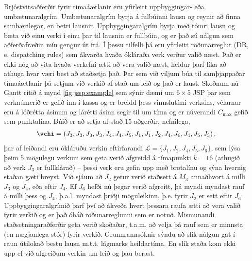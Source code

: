 \documentclass[]{article}
\begin{document}
Brjóstvitsaðferðir fyrir tímaáætlanir eru yfirleitt uppbyggingar- eða 
umbætunaralgrím.
Umbætunaralgrím byrja á fulbúinni lausn og reynir að finna sambærilegar, en 
betri lausnir. 
Uppbyggingaralgrím byrja með tómri lausn og bæta við einu verki í einu þar til 
lausnin er fullbúin, og er það sú nálgun sem aðferðafræðin mín gengur út frá. 
Í þessu tilfelli þá eru yfirleitt röðunarreglur (DR, e. dispatching 
rules) sem ákvarða hvaða ókláraða verk verður valið næst. Það er ekki nóg að 
vita hvaða verkefni ætti að vera valið næst, 
heldur þarf líka að athuga hvar væri best að staðsetja það. 
Þar sem við viljum búa til samþjappaðar tímaáætlanir  þá setjum við verkið af 
stað um leið og það er laust. 
Skoðnum nú Gantt ritið á mynd \ref{fig:jssp:example} sem sýnir dæmi um 
$6\times5$ JSP þar sem verknúmerið er gefið inn í kassa og er breidd þess 
vinnslutími verksins, 
vélarnar eru á lóðrétta ásinum og lárétti ásinn segir til um tíma 
og er núverandi $C_{\max}$ gefið sem punktalína. 
Búið er að setja af stað 15 aðgerðir, nefnilega, 
\begin{eqnarray}
\vchi=\left(J_3,J_3,J_3,J_3,J_4,J_4,J_5,J_1,J_1,J_2,J_4,J_6,J_4,J_5,J_3\right),
\end{eqnarray}
þar af leiðandi eru ókláruðu verkin eftirfarandi 
$\mathcal{L}=\{J_1,J_2,J_4,J_5,J_6\}$, sem lýsa þeim 5 mögulegu verkum sem geta 
verið afgreidd á tímapunkti $k=16$ (athugið að verk $J_3$ er fullklárað) -- 
þessi verk eru gefin upp með brotalínu og sýna hvernig staðan gæti breyst. 
Við sjáum að $J_2$ getur verið staðsett á $M_3$ annaðhvort á milli  $J_3$ og 
$J_4$, eða eftir $J_4$.  Ef $J_6$ hefði nú þegar verið afgreitt, þá myndi 
myndast rauf á milli þess og $J_4$, þ.a.l. myndast þriðji möguleikinn, þ.e. 
fyrir $J_2$ er sett eftir $J_6$. 
Uppbyggingaralgrímið þarf því að ákveða hvert þessara raufa ætti að vera 
valið fyrir verkið og er það óháð röðunarreglunni sem er notuð. 
Mismunandi staðsetningaraðferðir geta verið skoðaðar, t.a.m. að velja þá rauf 
sem er minnsta (en nægjanlega stór) fyrir verkið. Grunnrannsóknir sýndu að 
slík nálgun gat í raun útilokað bestu lausn m.t.t. lágmarks heildartíma. 
En slík staða kom ekki upp ef við afgreiðum verkin um leið og þau berast. 
\end{document}
